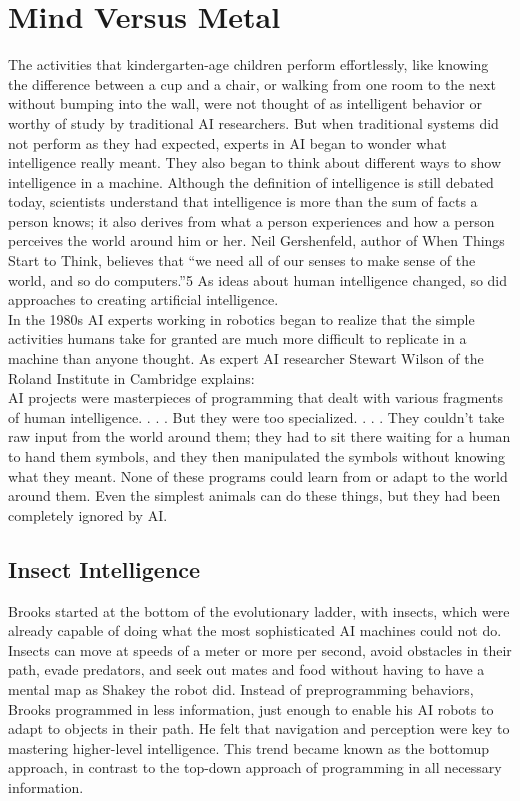 \documentclass[12pt]{article}
\begin{document}
\section{\textbf{Mind Versus Metal }}
\center
\large\flushleft
The activities that kindergarten-age children perform effortlessly, like knowing the difference between a cup and a chair, or walking from one room to the next without bumping into the wall, were not thought of as intelligent behavior or worthy of study by traditional AI researchers. But when traditional systems did not perform as they had expected, experts in AI began to wonder what intelligence really meant. They also began to think about different ways to show intelligence in a machine. Although the definition of intelligence is still debated today, scientists understand that intelligence is more than the sum of facts a person knows; it also derives from what a person experiences and how a person perceives the world around him or her. Neil Gershenfeld, author of When Things Start to Think, believes that “we need all of our senses to make sense of the world, and so do computers.”5 As ideas about human intelligence changed, so did approaches to creating artificial intelligence.\\
 In the 1980s AI experts working in robotics began to realize that the simple activities humans take for granted are much more difficult to replicate in a machine than anyone thought. As expert AI researcher Stewart Wilson of the Roland Institute in Cambridge explains:\\
AI projects were masterpieces of programming that dealt with various fragments of human intelligence. . . . But they were too specialized. . . . They couldn’t take raw input from the world
around them; they had to sit there waiting for a human to hand them symbols, and they then manipulated the symbols without knowing what they meant. None of these programs could learn from or adapt to the world around them. Even the simplest animals can do these things, but they had been completely ignored by AI.\\
\Huge
\subsection{\textbf{Insect Intelligence }}
\large
 Brooks started at the bottom of the evolutionary ladder, with insects, which were already capable of doing what the most sophisticated AI machines could not do. Insects can move at speeds of a meter or more per second, avoid obstacles in their path, evade predators, and seek out mates and food without having to have a mental map as Shakey the robot did. Instead of preprogramming behaviors, Brooks programmed in less information, just enough to enable his AI robots to adapt to objects in their path. He felt that navigation and perception were key to mastering higher-level intelligence. This trend became known as the bottomup approach, in contrast to the top-down approach of programming in all necessary information.\\
 \Huge
\end{document}
